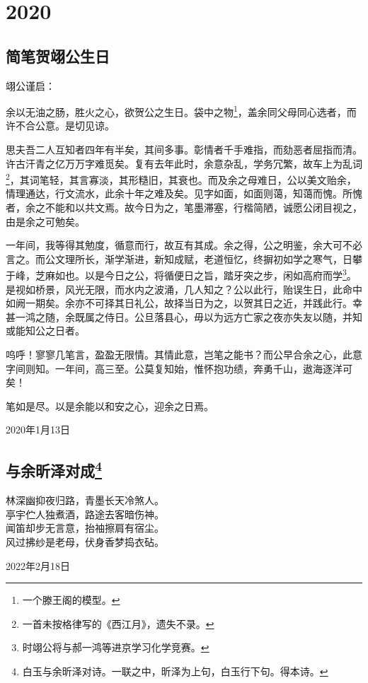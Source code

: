 \documentclass[a5paper]{ctexart}
\begin{document}
	\newpage
	\section{2020}
	
	\subsection{简笔贺翊公生日}
	\begin{flushleft}
		翊公谨启：
	\end{flushleft}
	
	余以无油之肠，胜火之心，欲贺公之生日。袋中之物\footnote{一个滕王阁的模型。}，盖余同父母同心选者，而许不合公意。是切见谅。
	
	思夫吾二人互知者四年有半矣，其间多事。彰情者千手难指，而劾恶者屈指而清。许古汗青之亿万万字难觅矣。复有去年此时，余意杂乱，学务冗繁，故车上为乱词\footnote{一首未按格律写的《西江月》，遗失不录。}，其词笔轻，其言寡淡，其形糙旧，其衰也。而及余之母难日，公以美文贻余，情理通达，行文流水，此余十年之难及矣。见字如面，如面则蔼，知蔼而愧。所愧者，余之不能和以共文焉。故今日为之，笔墨滞塞，行楷简陋，诚愿公闭目视之，由是余之可勉矣。
	
	一年间，我等得其勉度，循意而行，故互有其成。余之得，公之明鉴，余大可不必言之。而公文理所长，渐学渐进，新知成赋，老道恒忆，终摒初如学之寒气，日攀于峰，芝麻如也。以是今日之公，将循便日之旨，踏牙突之步，闲如高府而学\footnote{时翊公将与郝一鸿等进京学习化学竞赛。}。是视如桥景，风光无限，而水内之波涌，几人知之？公以此行，贻误生日，此命中如阙一期矣。余亦不可择其日礼公，故择当日为之，以贺其日之近，并践此行。幸甚一鸿之随，余既属之侍日。公旦落县心，毋以为远方亡家之夜亦失友以随，并知或能知公之日者。
	
	呜呼！寥寥几笔言，盈盈无限情。其情此意，岂笔之能书？而公早合余之心，此意字间则知。一年间，高三至。公莫复知始，惟怀抱功绩，奔勇千山，遨海逐洋可矣！
	
	笔如是尽。以是余能以和安之心，迎余之日焉。
	\begin{flushright}
		2020年1月13日
	\end{flushright}
	
	\subsection[与余昕泽对成]{与余昕泽对成\footnote{白玉与余昕泽对诗。一联之中，昕泽为上句，白玉行下句。得本诗。}}
	\begin{center}
		林深幽抑夜归路，青墨长天冷煞人。\\
		亭宇伫人独煮酒，路途去客暗伤神。\\
		闻笛却步无言意，抬袖擦肩有宿尘。\\
		风过拂纱是老母，伏身香梦捣衣砧。
		
	\end{center}
	\begin{flushright}
		2022年2月18日
	\end{flushright}
	
\end{document}

